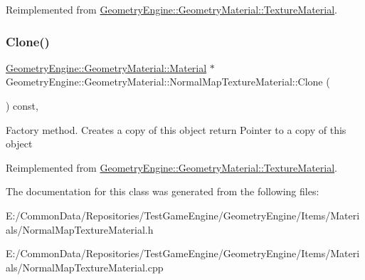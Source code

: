 Reimplemented from \mbox{\hyperlink{class_geometry_engine_1_1_geometry_material_1_1_texture_material_a39212e653a556734e261ef610ab0ad9f}{Geometry\+Engine\+::\+Geometry\+Material\+::\+Texture\+Material}}.

\mbox{\label{class_geometry_engine_1_1_geometry_material_1_1_normal_map_texture_material_a3a3d1f16cf175f084bc3eeab56f6e42f}} 
\subsubsection{\texorpdfstring{Clone()}{Clone()}}
{\footnotesize\ttfamily \mbox{\hyperlink{class_geometry_engine_1_1_geometry_material_1_1_material}{Geometry\+Engine\+::\+Geometry\+Material\+::\+Material}} $\ast$ Geometry\+Engine\+::\+Geometry\+Material\+::\+Normal\+Map\+Texture\+Material\+::\+Clone (\begin{DoxyParamCaption}{ }\end{DoxyParamCaption}) const\hspace{0.3cm}{\ttfamily [override]}, {\ttfamily [virtual]}}

Factory method. Creates a copy of this object return Pointer to a copy of this object 

Reimplemented from \mbox{\hyperlink{class_geometry_engine_1_1_geometry_material_1_1_texture_material_ace905cf02deb41ad8aa422ef2fb9070f}{Geometry\+Engine\+::\+Geometry\+Material\+::\+Texture\+Material}}.



The documentation for this class was generated from the following files\+:\begin{DoxyCompactItemize}
\item 
E\+:/\+Common\+Data/\+Repositories/\+Test\+Game\+Engine/\+Geometry\+Engine/\+Items/\+Materials/Normal\+Map\+Texture\+Material.\+h\item 
E\+:/\+Common\+Data/\+Repositories/\+Test\+Game\+Engine/\+Geometry\+Engine/\+Items/\+Materials/Normal\+Map\+Texture\+Material.\+cpp\end{DoxyCompactItemize}
